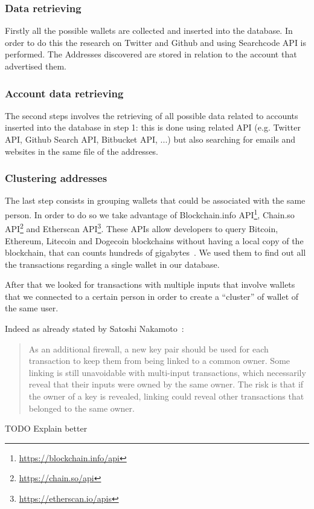 \subsubsection*{Data retrieving} Firstly all the possible wallets are collected
and inserted into the database. In order to do this the research on
Twitter and Github and using Searchcode API is performed. The Addresses discovered are stored in relation to the account that advertised them.
\subsubsection*{Account data retrieving} The second steps involves the
retrieving of all possible data related to accounts inserted into the database
in step 1: this is done using related API (e.g. Twitter API, Github Search API,
Bitbucket API, ...) but also searching for emails and websites in the same file
of the addresses.
\subsubsection*{Clustering addresses} The last step consists in grouping 
wallets that could be associated with the same person. In order to do so we take advantage of Blockchain.info API\footnote{\url{https://blockchain.info/api}},
Chain.so API\footnote{\url{https://chain.so/api}} and
Etherscan API\footnote{\url{https://etherscan.io/apis}}. These APIs allow
developers to query Bitcoin, Ethereum, Litecoin and Dogecoin blockchains without
having a local copy of the blockchain, that can counts hundreds of
gigabytes~\cite{}.
We used them to find out all the transactions regarding a single wallet
in our database. 

After that we looked for transactions with multiple inputs that
involve wallets that we connected to a certain person in order to create a
``cluster'' of wallet of the same user. 

Indeed as already stated by Satoshi Nakamoto~\cite{}:
\begin{quotation}
	As an additional firewall, a new key pair should be used for each
	transaction to keep them from being linked to a common owner.
	Some linking is still unavoidable with multi-input transactions, which
	necessarily reveal that their inputs were owned by the same owner. 
	The risk is that if the owner of a key is revealed, linking could reveal
	other transactions that belonged to
	the same owner.
\end{quotation}




TODO Explain better












